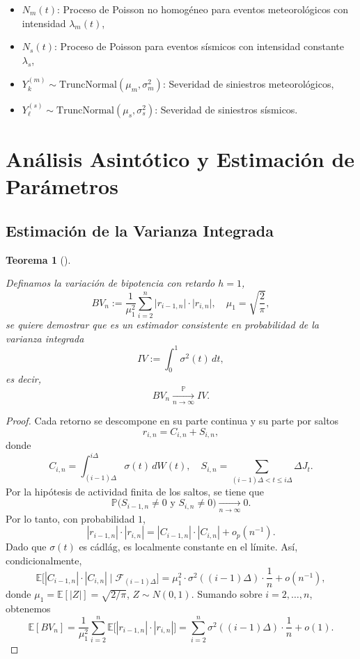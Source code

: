 \documentclass[
  spanish,
  us-letterpaper,
]{scrreprt}
\theoremstyle{plain}
\newtheorem{theorem}{Teorema}[chapter]
\theoremstyle{plain}
\theoremstyle{definition}
\theoremstyle{remark}
\begin{document}
\begin{itemize}
  crecimiento lineal que garantizan existencia y unicidad de soluciones
  fuertes para el proceso de reservas.
\item
  \(N_m(t)\): Proceso de Poisson no homogéneo para eventos
  meteorológicos con intensidad \(\lambda_m(t)\),
\item
  \(N_s(t)\): Proceso de Poisson para eventos sísmicos con intensidad
  constante \(\lambda_s\),
\item
  \(Y_k^{(m)} \sim \text{TruncNormal}(\mu_m, \sigma_m^2)\): Severidad de
  siniestros meteorológicos,
\item
  \(Y_\ell^{(s)} \sim \text{TruncNormal}(\mu_s, \sigma_s^2)\): Severidad
  de siniestros sísmicos.
\end{itemize}

\section{Análisis Asintótico y Estimación de
Parámetros}\label{anuxe1lisis-asintuxf3tico-y-estimaciuxf3n-de-paruxe1metros}

\subsection{Estimación de la Varianza
Integrada}\label{estimaciuxf3n-de-la-varianza-integrada}

\begin{theorem}[]\protect\hypertarget{thm-VB}{}\label{thm-VB}

Definamos la variación de bipotencia con retardo \(h = 1\),
\[BV_n := \frac{1}{\mu_1^2} \sum_{i=2}^{n} \bigl|r_{i-1,n}\bigr| \cdot \bigl|r_{i,n}\bigr|, \quad \mu_1 = \sqrt{\frac{2}{\pi}},\]
se quiere demostrar que es un estimador consistente en probabilidad de
la varianza integrada \[IV := \int_0^1 \sigma^2(t)\,dt,\] es decir,
\[BV_n \xrightarrow[n\to\infty]{\mathbb{P}} IV.\]

\end{theorem}

\begin{proof}
Cada retorno se descompone en su parte continua y su parte por saltos
\[r_{i,n} = C_{i,n} + S_{i,n},\] donde
\[C_{i,n} = \int_{(i-1)\Delta}^{i\Delta} \sigma(t)\,dW(t), \quad 
S_{i,n} = \sum_{(i-1)\Delta < t \leq i\Delta} \Delta J_t.\] Por la
hipótesis de actividad finita de los saltos, se tiene que
\[\mathbb{P}\bigl(S_{i-1,n} \neq 0 \text{ y } S_{i,n} \neq 0\bigr) \xrightarrow[n\to\infty]{} 0.\]
Por lo tanto, con probabilidad \(1\),
\[|r_{i-1,n}| \cdot |r_{i,n}| = |C_{i-1,n}| \cdot |C_{i,n}| + o_p(n^{-1}).\]
Dado que \(\sigma(t)\) es cádlág, es localmente constante en el límite.
Así, condicionalmente,
\[\mathbb{E}\bigl[|C_{i-1,n}| \cdot |C_{i,n}| \mid \mathcal{F}_{(i-1)\Delta}\bigr] 
= \mu_1^2 \cdot \sigma^2((i-1)\Delta) \cdot \frac{1}{n} + o(n^{-1}),\]
donde \(\mu_1 = \mathbb{E}[|Z|] = \sqrt{2/\pi}\), \(Z \sim N(0,1)\).
Sumando sobre \(i = 2,\dots,n\), obtenemos
\[\mathbb{E}[BV_n] = \frac{1}{\mu_1^2} \sum_{i=2}^n \mathbb{E}\bigl[|r_{i-1,n}| \cdot |r_{i,n}|\bigr]
= \sum_{i=2}^n \sigma^2((i-1)\Delta) \cdot \frac{1}{n} + o(1).\]
\end{proof}
\end{document}
